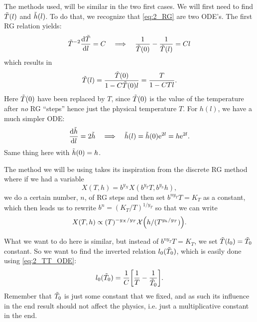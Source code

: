 \documentclass[11pt,letter, swedish, english
]{article}
\begin{document}
The methods used, will be similar in the two first cases. We will first
need to find $\tilde{T}(l)$ and $\tilde{h}(l)$.\footnotemark{} To do that, we
recognize that \eqref{eq:2_RG} are two ODE's. The first RG relation
yields:
\begin{equation}\label{eq:2_TT_ODE}
\tilde{T}^{-2}\dv{\tilde{T}}{l} = C
\quad\Longrightarrow\quad
\frac{1}{\tilde{T}(0)}-\frac{1}{\tilde{T}(l)} = Cl
\end{equation}
which results in
\begin{equation}\label{eq:2_TT(l)}
\tilde{T}(l) = \frac{\tilde{T}(0)}{1-C\tilde{T}(0)l} = \frac{T}{1-CTl}.
\end{equation}
Here $\tilde{T}(0)$ have been replaced by $T$, since $\tilde{T}(0)$ is the value
of the temperature after \emph{no} RG ``steps'' hence just the
physical temperature $T$. For $h(l)$, we have a much simpler ODE:
\begin{equation}\label{eq:2_hT(l)}
\dv{\tilde{h}}{l} = 2\tilde{h}
\quad\Longrightarrow\quad
\tilde{h}(l) = \tilde{h}(0)\mathrm{e}^{2l} = h\mathrm{e}^{2l}.
\end{equation}
Same thing here with $\tilde{h}(0)=h$.


The method we will be using takes its inspiration from the discrete
RG method where if we had a variable
\begin{equation}
X(T,h) = b^{y_X}X(b^{y_T}T, b^{y_h}h),
\end{equation}
we do a certain number, $n$, of RG steps and then set $b^{ny_T}T=K_T$
as a constant, which then leads us to rewrite $b^n = (K_T/T)^{1/y_T}$ so
that we can write
\begin{equation}
X(T,h) \propto (T)^{-y_X/y_T}\mathcal{X}\qty(h/(T^{y_h/y_T})).
\end{equation}

What we want to do here is similar, but instead of $b^{ny_T}T=K_T$, we
set $\tilde{T}(l_0) = \tilde{T}_0$ constant. So we want to find the inverted
relation $l_0(\tilde{T}_0)$, which is easily done using \eqref{eq:2_TT_ODE}:
\begin{equation}\label{eq:2_l(TT)}
l_0(\tilde{T}_0) = \frac{1}{C}\qty[\frac{1}{T}-\frac{1}{\tilde{T}_0}].
\end{equation}
Remember that $\tilde{T}_0$ is just some constant that we fixed, and as such
its influence in the end result should not affect the physics,
i.e. just a multiplicative constant in the end. 
\end{document}
